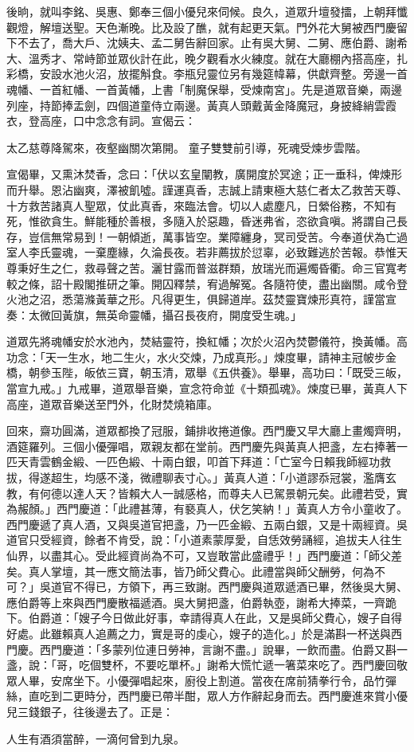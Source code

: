 後晌，就叫李銘、吳惠、鄭奉三個小優兒來伺候。良久，道眾升壇發擂，上朝拜懺觀燈，解壇送聖。天色漸晚。比及設了醮，就有起更天氣。門外花大舅被西門慶留下不去了，喬大戶、沈姨夫、孟二舅告辭回家。止有吳大舅、二舅、應伯爵、謝希大、溫秀才、常峙節並眾伙計在此，晚夕觀看水火練度。就在大廳棚內搭高座，扎彩橋，安設水池火沼，放擺斛食。李瓶兒靈位另有幾筵幃幕，供獻齊整。旁邊一首魂幡、一首紅幡、一首黃幡，上書「制魔保舉，受煉南宮」。先是道眾音樂，兩邊列座，持節捧盂劍，四個道童侍立兩邊。黃真人頭戴黃金降魔冠，身披絳綃雲霞衣，登高座，口中念念有詞。宣偈云：

太乙慈尊降駕來，夜壑幽關次第開。
童子雙雙前引導，死魂受煉步雲階。

宣偈畢，又熏沐焚香，念曰：「伏以玄皇闡教，廣開度於冥途；正一垂科，俾煉形而升舉。恩沾幽爽，澤被飢噓。謹運真香，志誠上請東極大慈仁者太乙救苦天尊、十方救苦諸真人聖眾，仗此真香，來臨法會。切以人處塵凡，日縈俗務，不知有死，惟欲貪生。鮮能種於善根，多隨入於惡趣，昏迷弗省，恣欲貪嗔。將謂自己長存，豈信無常易到！一朝傾逝，萬事皆空。業障纏身，冥司受苦。今奉道伏為亡過室人李氏靈魂，一棄塵緣，久淪長夜。若非薦拔於愆辜，必致難逃於苦報。恭惟天尊秉好生之仁，救尋聲之苦。灑甘露而普滋群類，放瑞光而遍燭昏衢。命三官寬考較之條，詔十殿閣推研之筆。開囚釋禁，宥過解冤。各隨符使，盡出幽關。咸令登火池之沼，悉蕩滌黃華之形。凡得更生，俱歸道岸。茲焚靈寶煉形真符，謹當宣奏：太微回黃旗，無英命靈幡，攝召長夜府，開度受生魂。」

道眾先將魂幡安於水池內，焚結靈符，換紅幡；次於火沼內焚鬱儀符，換黃幡。高功念：「天一生水，地二生火，水火交煉，乃成真形。」煉度畢，請神主冠帔步金橋，朝參玉陛，皈依三寶，朝玉清，眾舉《五供養》。舉畢，高功曰：「既受三皈，當宣九戒。」九戒畢，道眾舉音樂，宣念符命並《十類孤魂》。煉度已畢，黃真人下高座，道眾音樂送至門外，化財焚燒箱庫。

回來，齋功圓滿，道眾都換了冠服，鋪排收捲道像。西門慶又早大廳上畫燭齊明，酒筵羅列。三個小優彈唱，眾親友都在堂前。西門慶先與黃真人把盞，左右捧著一匹天青雲鶴金緞、一匹色緞、十兩白銀，叩首下拜道：「亡室今日賴我師經功救拔，得遂超生，均感不淺，微禮聊表寸心。」黃真人道：「小道謬忝冠裳，濫膺玄教，有何德以達人天？皆賴大人一誠感格，而尊夫人已駕景朝元矣。此禮若受，實為赧顏。」西門慶道：「此禮甚薄，有褻真人，伏乞笑納！」黃真人方令小童收了。西門慶遞了真人酒，又與吳道官把盞，乃一匹金緞、五兩白銀，又是十兩經資。吳道官只受經資，餘者不肯受，說：「小道素蒙厚愛，自恁效勞誦經，追拔夫人往生仙界，以盡其心。受此經資尚為不可，又豈敢當此盛禮乎！」西門慶道：「師父差矣。真人掌壇，其一應文簡法事，皆乃師父費心。此禮當與師父酬勞，何為不可？」吳道官不得已，方領下，再三致謝。西門慶與道眾遞酒已畢，然後吳大舅、應伯爵等上來與西門慶散福遞酒。吳大舅把盞，伯爵執壺，謝希大捧菜，一齊跪下。伯爵道：「嫂子今日做此好事，幸請得真人在此，又是吳師父費心，嫂子自得好處。此雖賴真人追薦之力，實是哥的虔心，嫂子的造化。」於是滿斟一杯送與西門慶。西門慶道：「多蒙列位連日勞神，言謝不盡。」說畢，一飲而盡。伯爵又斟一盞，說：「哥，吃個雙杯，不要吃單杯。」謝希大慌忙遞一箸菜來吃了。西門慶回敬眾人畢，安席坐下。小優彈唱起來，廚役上割道。當夜在席前猜拳行令，品竹彈絲，直吃到二更時分，西門慶已帶半酣，眾人方作辭起身而去。西門慶進來賞小優兒三錢銀子，往後邊去了。正是：

人生有酒須當醉，一滴何曾到九泉。

